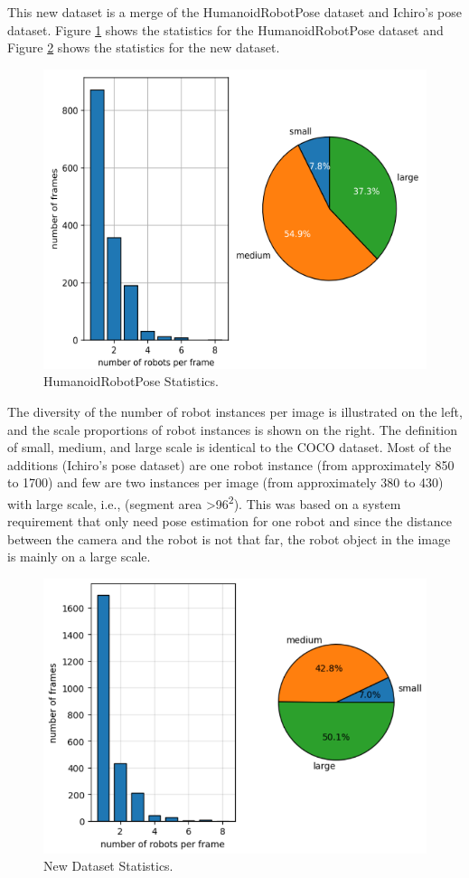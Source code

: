 This new dataset is a merge of the HumanoidRobotPose dataset and Ichiro's pose dataset. Figure \ref{fig:nimbro-statistics} shows the statistics for the HumanoidRobotPose dataset and Figure \ref{fig:new-dataset-statistics} shows the statistics for the new dataset.
\begin{figure}[ht]
  \centering
  \includegraphics[scale=0.8]{gambar/old_dataset.png}
  \caption{HumanoidRobotPose Statistics.}
  \label{fig:nimbro-statistics}
\end{figure}
The diversity of the number of robot instances per image is illustrated on the left, and the scale proportions of robot instances is shown on the right. The definition of small, medium, and large scale is identical to the COCO dataset.
Most of the additions (Ichiro's pose dataset) are one robot instance (from approximately 850 to 1700) and few are two instances per image (from approximately 380 to 430) with large scale, i.e., (segment area \textgreater 96\textsuperscript{2}). 
This was based on a system requirement that only need pose estimation for one robot and since the distance between the camera and the robot is not that far, the robot object in the image is mainly on a large scale.
\begin{figure}[ht]
  \centering
  \includegraphics[scale=0.63]{gambar/new_dataset.png}
  \caption{New Dataset Statistics.}
  \label{fig:new-dataset-statistics}
\end{figure}


